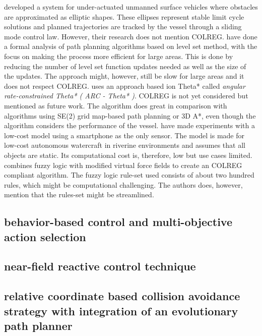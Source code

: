 \textcite{soltan2009trajectory} developed a system for under-actuated unmanned surface vehicles where obstacles are approximated as elliptic shapes. These ellipses represent stable limit cycle solutions and planned trajectories are tracked by the vessel through a sliding mode control law. However, their research does not mention COLREG.
\textcite{xu2013fast} have done a formal analysis of path planning algorithms based on level set method, with the focus on making the process more efficient for large areas. This is done by reducing the number of level set function updates needed as well as the size of the updates. The approach might, however, still be slow for large areas and it does not respect COLREG.
\textcite{kim2014angular} uses an approach based ion Theta* called \textit{angular rate-constrained  Theta* ( ARC - Theta* )}. COLREG is not yet considered but mentioned as future work. The algorithm does great in comparison with algorithms using SE(2) grid map-based path planning or 3D A*, even though the algorithm considers the performance of the vessel.
\textcite{el2013visual} have made experiments with a low-cost model using a smartphone as the only sensor. The model is made for low-cost autonomous watercraft in riverine environments and assumes that all objects are static. Its computational cost is, therefore, low but use cases limited.
\textcite{lee2004fuzzy} combines fuzzy logic with modified virtual force fields to  create an COLREG compliant algorithm. The fuzzy logic rule-set used consists of about two hundred rules, which might be computational challenging. The authors does, however, mention that the rules-set might be streamlined.
\subsection{behavior-based control and multi-objective action selection} \cite{benjamin2004colregs,benjamin2006method}

\subsection{near-field reactive control technique }\cite{larson2007advances}

\subsection{relative coordinate based collision avoidance strategy with integration of an evolutionary path planner }\cite{zhuang2011motion}

